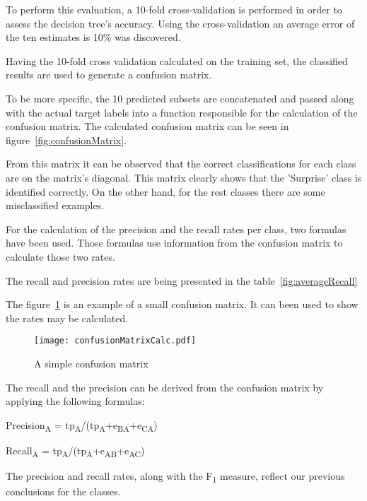 To perform this evaluation, a 10-fold cross-validation is performed in
order to assess the decision tree's accuracy. Using the cross-validation an
average error of the ten estimates is 10\% was discovered. 

Having the 10-fold cross validation calculated on the training set, the
classified results are used to generate a confusion matrix.

To be more specific, the 10 predicted subsets are concatenated and passed along
with the actual target labels into a function responsible for the calculation of
the confusion matrix. The calculated confusion matrix can be seen in
figure~\ref{fig:confusionMatrix}.



From this matrix it can be observed that the correct classifications for each
class are on the matrix's diagonal. This matrix clearly shows that the
'Surprise' class is identified correctly. On the other hand, for the rest classes there are some misclassified examples. 

For the calculation of the precision and the recall rates per class, two
formulas have been used. Those formulas use information from the confusion
matrix to calculate those two rates.

The recall and precision rates are being presented in the table~\ref{fig:averageRecall}


The figure~\ref{fig:confisionMatixCalc} is an example of a small confusion matrix.
It can been used to show the rates may be calculated.

\begin{figure}[h]
    \centering
    \texttt{[image: confusionMatrixCalc.pdf]}
    \caption{A simple confusion matrix}
    \label{fig:confisionMatixCalc}
\end{figure}

The recall and the precision can be derived from the confusion matrix by
applying the following formulas:

Precision\textsubscript{A} = tp\textsubscript{A}/(tp\textsubscript{A}+e\textsubscript{BA}+e\textsubscript{CA})

Recall\textsubscript{A} = tp\textsubscript{A}/(tp\textsubscript{A}+e\textsubscript{AB}+e\textsubscript{AC})

The precision and recall rates, along with the F\textsubscript{1} measure, reflect our previous conclusions for the classes.
